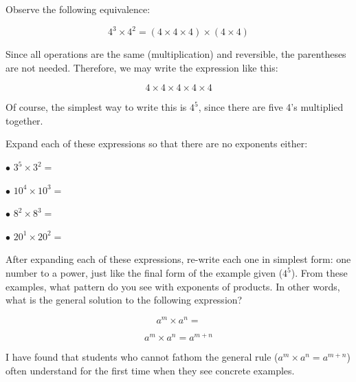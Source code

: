 

Observe the following equivalence:

$$4^3 \times 4^2 = (4 \times 4 \times 4) \times (4 \times 4)$$

Since all operations are the same (multiplication) and reversible, the parentheses are not needed.  Therefore, we may write the expression like this:

$$4 \times 4 \times 4 \times 4 \times 4$$

Of course, the simplest way to write this is $4^5$, since there are five 4's multiplied together.

\vskip 10pt

Expand each of these expressions so that there are no exponents either:

\medskip
\goodbreak
\item{$\bullet$} $3^5 \times 3^2 = $
\vskip 5pt
\item{$\bullet$} $10^4 \times 10^3 = $
\vskip 5pt
\item{$\bullet$} $8^2 \times 8^3 = $
\vskip 5pt
\item{$\bullet$} $20^1 \times 20^2 = $
\medskip

After expanding each of these expressions, re-write each one in simplest form: one number to a power, just like the final form of the example given ($4^5$).  From these examples, what pattern do you see with exponents of products.  In other words, what is the general solution to the following expression?

$$a^m \times a^n = $$







$$a^m \times a^n = a^{m+n}$$







I have found that students who cannot fathom the general rule ($a^m \times a^n = a^{m+n}$) often understand for the first time when they see concrete examples.




